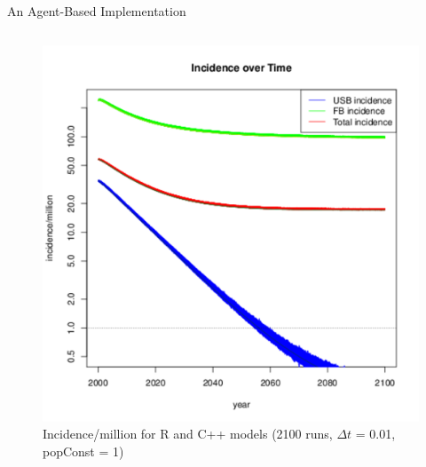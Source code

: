 \documentclass[final]{beamer}
\begin{document}
\begin{frame}
\begin{columns}
\begin{column}{.3\textwidth}
\begin{block}{An Agent-Based Implementation}
\begin{columns}
\begin{column}{.45\textwidth}
\begin{figure}[h]
              \begin{center}
                \includegraphics[width=\textwidth]{finalRunSmall}
              \end{center}
              \caption{Incidence/million for R and C++ models (2100 runs, $\Delta t$ = 0.01, popConst = 1)}
              \label{fig:finalRun}
            \end{figure}
          \end{column}
        \end{columns}
      \end{block}
      

\end{column}
\end{columns}
\end{frame}
\end{document}
